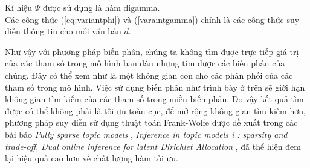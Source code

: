 \documentclass[fontsize=13pt]{scrartcl}
\begin{document}
Kí hiệu $\Psi$ được sử dụng là hàm digamma. \\
Các công thức (\ref{eq:variantphi}) và (\ref{varaintgamma}) chính là các công thức suy diễn thông tin cho mỗi văn bản $d$.
\par
Như vậy với phương pháp biến phân, chúng ta không tìm được trực tiếp giá trị của các tham số trong mô hình ban đầu nhưng tìm được các biến phân của chúng. Đây có thể xem như là một không gian con cho các phân phối của các tham số trong mô hình. Việc sử dụng biến phân như trình bày ở trên sẽ giới hạn không gian tìm kiếm của các tham số trong miền biến phân. Do vậy kết quả tìm được có thể không phải là tối ưu toàn cục, để mở rộng không gian tìm kiếm hơn, phương pháp suy diễn sử dụng thuật toán Frank-Wolfe được đề xuất trong các bài báo \textit{Fully sparse topic models} \cite{fullyspared}, \textit{Inference in topic models i : sparsity and trade-off}\cite{fwinfer}, \textit{Dual online inference for latent Dirichlet Allocation} \cite{dualonline}, đã thể hiện đem lại hiệu quả cao hơn về chất lượng hàm tối ưu.
\end{document}
